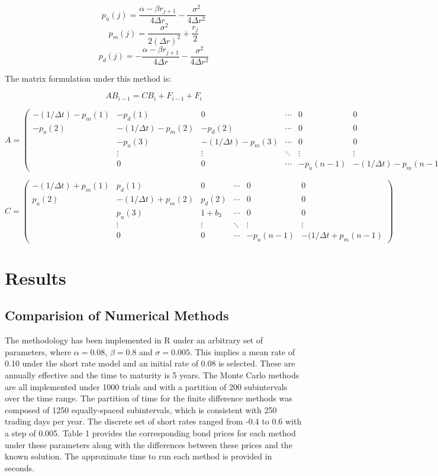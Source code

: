 \documentclass[12pt,a4paper]{article}
\begin{document}
$$p_u(j)=\frac{\alpha-\beta r_{j+1}}{4\Delta r} - \frac{\sigma^2}{4\Delta r^2}$$
$$p_m(j)= \frac{\sigma^2}{2 (\Delta r)^2}+\frac{r_{j}}{2}$$
$$p_d(j)=-\frac{\alpha-\beta r_{j+1}}{4\Delta r} - \frac{\sigma^2}{4\Delta r^2}$$

The matrix formulation under this method is:

$$AB_{i-1}=CB_{i}+F_{i-1}+F_{i}$$


$$A= \left( \begin{array}{cccccc}
-(1/\Delta t)-p_m(1) & -p_d(1) & 0 & \cdots  & 0 & 0\\
-p_u(2) & -(1/\Delta t)-p_m(2) & -p_d(2) &\cdots & 0 & 0 \\
& -p_u(3) & -(1/\Delta t)-p_m(3) & \cdots & 0 & 0  \\
& \vdots &\vdots & \ddots & \vdots & \vdots \\ 
& 0 & 0 & \cdots & -p_u(n-1) & -(1/\Delta t)-p_m(n-1) \end{array} \right)
$$

$$C=\left( \begin{array}{cccccc}
-(1/\Delta t)+p_m(1) & p_d(1) & 0 & \cdots  & 0 & 0\\
p_u(2) & -(1/\Delta t)+p_m(2) & p_d(2) &\cdots & 0 & 0 \\
& p_u(3) & 1+b_{3} & \cdots & 0 & 0  \\
& \vdots &\vdots & \ddots & \vdots & \vdots \\ 
& 0 & 0 & \cdots & -p_u(n-1) & -(1/\Delta t+p_m(n-1) \end{array} \right) 
$$



\newpage
\section{Results}
\label{sec: Results}

\subsection{Comparision of Numerical Methods}
\label{subsec: Compar}
The methodology has been implemented in R under an arbitrary set of parameters, where $\alpha = 0.08$, $\beta = 0.8$ and $\sigma=0.005$. This implies a mean rate of 0.10 under the short rate model and an initial rate of 0.08 is selected. These are annually effective and the time to maturity is 5 years. The Monte Carlo methods are all implemented under 1000 trials and with a partition of 200 subintervals over the time range. The partition of time for the finite difference methods was composed of 1250 equally-spaced subintervals, which is consistent with 250 trading days per year. The discrete set of short rates ranged from -0.4 to 0.6 with a step of 0.005. Table 1 provides the corresponding bond prices for each method under these parameters along with the differences between these prices and the known solution. The approximate time to run each method is provided in seconds.
\end{document}
